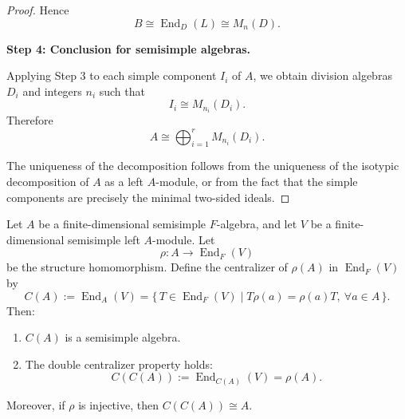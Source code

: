 \begin{proof}
Hence
\[
B \cong \operatorname{End}_D(L) \cong M_n(D).
\]

\medskip
\noindent\textbf{Step 4: Conclusion for semisimple algebras.}

Applying Step 3 to each simple component $I_i$ of $A$, we obtain division algebras $D_i$ and integers $n_i$ such that
\[
I_i \cong M_{n_i}(D_i).
\]
Therefore
\[
A \cong \bigoplus_{i=1}^r M_{n_i}(D_i).
\]

The uniqueness of the decomposition follows from the uniqueness of the isotypic decomposition of $A$ as a left $A$-module, or from the fact that the simple components are precisely the minimal two-sided ideals.
\end{proof}



\begin{lemma}
\label{thm:doublecentralizer}
Let $A$ be a finite-dimensional semisimple $F$-algebra, and let $V$ be a finite-dimensional semisimple left $A$-module. Let
\[
\rho: A \longrightarrow \operatorname{End}_F(V)
\]
be the structure homomorphism. Define the centralizer of $\rho(A)$ in $\operatorname{End}_F(V)$ by
\[
C(A):=\operatorname{End}_A(V)
= \{\, T \in \operatorname{End}_F(V) \mid T\rho(a)=\rho(a)T,\ \forall a\in A \,\}.
\]
Then:
\begin{enumerate}
\item $C(A)$ is a semisimple algebra.
\item The double centralizer property holds:
\[
C(C(A)):=\operatorname{End}_{C(A)}(V)=\rho(A).
\]
\end{enumerate}

Moreover, if $\rho$ is injective, then $C(C(A))\cong A$.
\end{lemma}

